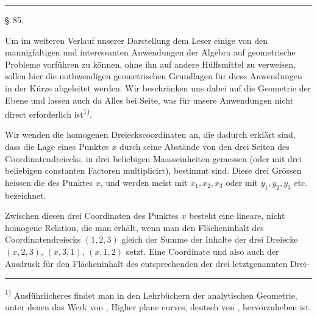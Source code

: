 
\begin{center}

\textbf{}

\noindent\rule{0.25\linewidth}{0.4pt}

\S.\,85.

\end{center}

Um im weiteren Verlauf unserer Darstellung dem Leser
einige von den mannigfaltigen und interessanten Anwendungen
der Algebra auf geometrische Probleme vorführen zu können,
ohne ihn auf andere Hülfsmittel zu verweisen, sollen hier die
nothwendigen geometrischen Grundlagen für diese Anwendungen
in der Kürze abgeleitet werden. Wir beschränken uns dabei
auf die Geometrie der Ebene und lassen auch da Alles bei Seite,
was für unsere Anwendungen nicht direct erforderlich ist\textsuperscript{1)}.

Wir wenden die homogenen Dreieckscoordinaten an, die dadurch erklärt sind, dass die Lage eines Punktes $x$ durch seine
Abstände von den drei Seiten des Coordinatendreiecks, in drei
beliebigen Maasseinheiten gemessen (oder mit drei beliebigen
constanten Factoren multiplicirt), bestimmt sind. Diese drei
Grössen heissen die  des Punktes $x$, und werden
meist mit $x_1, x_2, x_3$ oder mit $y_1, y_2, y_3$ etc. bezeichnet.

Zwischen diesen drei Coordinaten des Punktes $x$ besteht
eine lineare, nicht homogene Relation, die man erhält, wenn man
den Flächeninhalt des Coordinatendreiecks $(1, 2, 3)$ gleich der
Summe der Inhalte der drei Dreiecke $(x, 2, 3)$, $(x, 3, 1)$, $(x, 1, 2)$
setzt. Eine Coordinate und also auch der Ausdruck für den
Flächeninhalt des entsprechenden der drei letztgenannten Drei-

\noindent\rule{0.25\linewidth}{0.4pt}

\footnotesize
\noindent\textsuperscript{1)} Ausführlicheres findet man in den Lehrbüchern der analytischen
Geometrie, unter denen das Werk von , \glqq Higher plane
curves\grqq{}, deutsch von , hervorzuheben ist.
\normalsize
